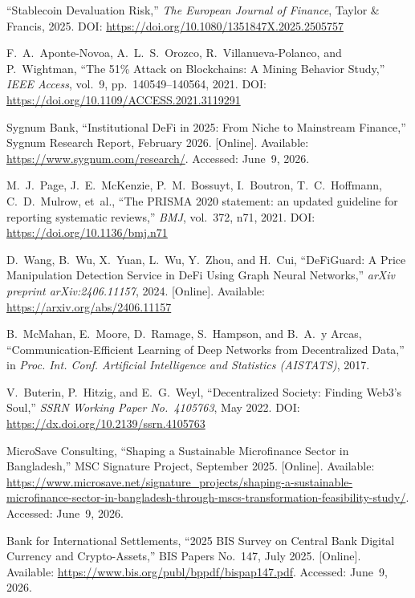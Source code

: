 \documentclass[12pt, a4paper]{report}
\begin{document}
{\begin{enumerate}[label={[\arabic*]}]
\item ``Stablecoin Devaluation Risk,'' \textit{The European Journal of Finance}, Taylor \& Francis, 2025. DOI: \url{https://doi.org/10.1080/1351847X.2025.2505757}

\item F.~A.~Aponte-Novoa, A.~L.~S.~Orozco, R.~Villanueva-Polanco, and P.~Wightman, ``The 51\% Attack on Blockchains: A Mining Behavior Study,'' \textit{IEEE Access}, vol.~9, pp.~140549--140564, 2021. DOI: \url{https://doi.org/10.1109/ACCESS.2021.3119291}

\item Sygnum Bank, ``Institutional DeFi in 2025: From Niche to Mainstream Finance,'' Sygnum Research Report, February 2026. [Online]. Available: \url{https://www.sygnum.com/research/}. Accessed: June~9, 2026.

\item M.~J.~Page, J.~E.~McKenzie, P.~M.~Bossuyt, I.~Boutron, T.~C.~Hoffmann, C.~D.~Mulrow, et~al., ``The PRISMA 2020 statement: an updated guideline for reporting systematic reviews,'' \textit{BMJ}, vol.~372, n71, 2021. DOI: \url{https://doi.org/10.1136/bmj.n71}

\item D.~Wang, B.~Wu, X.~Yuan, L.~Wu, Y.~Zhou, and H.~Cui, ``DeFiGuard: A Price Manipulation Detection Service in DeFi Using Graph Neural Networks,'' \textit{arXiv preprint arXiv:2406.11157}, 2024. [Online]. Available: \url{https://arxiv.org/abs/2406.11157}

\item B.~McMahan, E.~Moore, D.~Ramage, S.~Hampson, and B.~A.~y Arcas, ``Communication-Efficient Learning of Deep Networks from Decentralized Data,'' in \textit{Proc. Int. Conf. Artificial Intelligence and Statistics (AISTATS)}, 2017.

\item V.~Buterin, P.~Hitzig, and E.~G.~Weyl, ``Decentralized Society: Finding Web3's Soul,'' \textit{SSRN Working Paper No.~4105763}, May 2022. DOI: \url{https://dx.doi.org/10.2139/ssrn.4105763}

\item MicroSave Consulting, ``Shaping a Sustainable Microfinance Sector in Bangladesh,'' MSC Signature Project, September 2025. [Online]. Available: \url{https://www.microsave.net/signature_projects/shaping-a-sustainable-microfinance-sector-in-bangladesh-through-mscs-transformation-feasibility-study/}. Accessed: June~9, 2026.

\item Bank for International Settlements, ``2025 BIS Survey on Central Bank Digital Currency and Crypto-Assets,'' BIS Papers No.~147, July 2025. [Online]. Available: \url{https://www.bis.org/publ/bppdf/bispap147.pdf}. Accessed: June~9, 2026.


\end{enumerate}}
\end{document}
